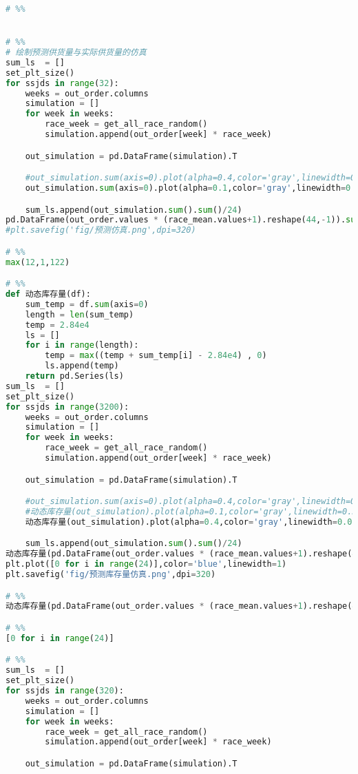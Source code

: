 \begin{appendices}
\begin{lstlisting}[language=python]
# %%


# %%
# 绘制预测供货量与实际供货量的仿真
sum_ls  = []
set_plt_size()
for ssjds in range(32):
    weeks = out_order.columns
    simulation = []
    for week in weeks:
        race_week = get_all_race_random()
        simulation.append(out_order[week] * race_week)

    out_simulation = pd.DataFrame(simulation).T

    #out_simulation.sum(axis=0).plot(alpha=0.4,color='gray',linewidth=0.05)
    out_simulation.sum(axis=0).plot(alpha=0.1,color='gray',linewidth=0.5)

    sum_ls.append(out_simulation.sum().sum()/24)
pd.DataFrame(out_order.values * (race_mean.values+1).reshape(44,-1)).sum().plot(color='r',linewidth=2)
#plt.savefig('fig/预测仿真.png',dpi=320)

# %%
max(12,1,122)

# %%
def 动态库存量(df):
    sum_temp = df.sum(axis=0)
    length = len(sum_temp)
    temp = 2.84e4
    ls = []
    for i in range(length):
        temp = max((temp + sum_temp[i] - 2.84e4) , 0)
        ls.append(temp)
    return pd.Series(ls)
sum_ls  = []
set_plt_size()
for ssjds in range(3200):
    weeks = out_order.columns
    simulation = []
    for week in weeks:
        race_week = get_all_race_random()
        simulation.append(out_order[week] * race_week)

    out_simulation = pd.DataFrame(simulation).T

    #out_simulation.sum(axis=0).plot(alpha=0.4,color='gray',linewidth=0.05)
    #动态库存量(out_simulation).plot(alpha=0.1,color='gray',linewidth=0.5)
    动态库存量(out_simulation).plot(alpha=0.4,color='gray',linewidth=0.05)

    sum_ls.append(out_simulation.sum().sum()/24)
动态库存量(pd.DataFrame(out_order.values * (race_mean.values+1).reshape(44,-1))).plot(color='r',linewidth=2)
plt.plot([0 for i in range(24)],color='blue',linewidth=1)
plt.savefig('fig/预测库存量仿真.png',dpi=320)

# %%
动态库存量(pd.DataFrame(out_order.values * (race_mean.values+1).reshape(44,-1)))

# %%
[0 for i in range(24)]

# %%
sum_ls  = []
set_plt_size()
for ssjds in range(320):
    weeks = out_order.columns
    simulation = []
    for week in weeks:
        race_week = get_all_race_random()
        simulation.append(out_order[week] * race_week)

    out_simulation = pd.DataFrame(simulation).T


\end{lstlisting}
\end{appendices}
